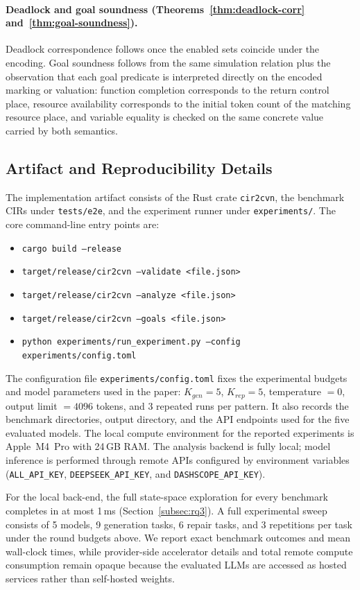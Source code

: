 \paragraph{Deadlock and goal soundness (Theorems~\ref{thm:deadlock-corr} and~\ref{thm:goal-soundness}).}
Deadlock correspondence follows once the enabled sets coincide under the encoding. Goal soundness follows from the same simulation relation plus the observation that each goal predicate is interpreted directly on the encoded marking or valuation: function completion corresponds to the return control place, resource availability corresponds to the initial token count of the matching resource place, and variable equality is checked on the same concrete value carried by both semantics.

\subsection{Artifact and Reproducibility Details}
\label{app:artifact}

The implementation artifact consists of the Rust crate \texttt{cir2cvn}, the benchmark CIRs under \texttt{tests/e2e}, and the experiment runner under \texttt{experiments/}. The core command-line entry points are:
\begin{itemize}[leftmargin=1.4em]
  \item \texttt{cargo build --release}
  \item \texttt{target/release/cir2cvn --validate <file.json>}
  \item \texttt{target/release/cir2cvn --analyze <file.json>}
  \item \texttt{target/release/cir2cvn --goals <file.json>}
  \item \texttt{python experiments/run\_experiment.py --config experiments/config.toml}
\end{itemize}

The configuration file \texttt{experiments/config.toml} fixes the experimental budgets and model parameters used in the paper: $K_{\mathit{gen}}=5$, $K_{\mathit{rep}}=5$, temperature $=0$, output limit $=4096$ tokens, and 3 repeated runs per pattern. It also records the benchmark directories, output directory, and the API endpoints used for the five evaluated models. The local compute environment for the reported experiments is Apple~M4~Pro with 24\,GB RAM. The analysis backend is fully local; model inference is performed through remote APIs configured by environment variables (\texttt{ALL\_API\_KEY}, \texttt{DEEPSEEK\_API\_KEY}, and \texttt{DASHSCOPE\_API\_KEY}).

For the local back-end, the full state-space exploration for every benchmark completes in at most 1\,ms (Section~\ref{subsec:rq3}). A full experimental sweep consists of 5 models, 9 generation tasks, 6 repair tasks, and 3 repetitions per task under the round budgets above. We report exact benchmark outcomes and mean wall-clock times, while provider-side accelerator details and total remote compute consumption remain opaque because the evaluated LLMs are accessed as hosted services rather than self-hosted weights.
